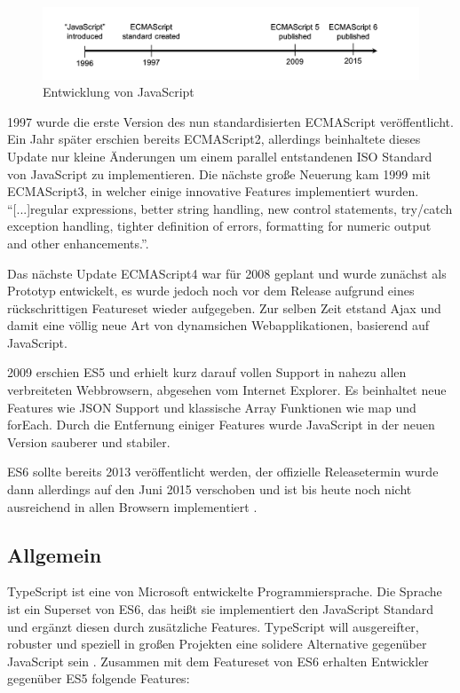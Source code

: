 \begin{figure}[hp]
 \centering
 \includegraphics[width=\linewidth]{kapitel2/javascript-timeline.png}
 \caption{Entwicklung von JavaScript \cite[28]{EssentialTS}}
\end{figure}

1997 wurde die erste Version des nun standardisierten ECMAScript veröffentlicht. Ein Jahr später erschien bereits ECMAScript2,
allerdings beinhaltete dieses Update nur kleine Änderungen um einem parallel entstandenen ISO Standard von JavaScript zu implementieren.
Die nächste große Neuerung kam 1999 mit ECMAScript3, in welcher einige innovative Features implementiert wurden.
``[...]regular expressions, better string handling, new control statements, try/catch exception handling, tighter definition of errors, formatting for numeric output and other enhancements.''\cite{js-vs-es}.

Das nächste Update ECMAScript4 war für 2008 geplant und wurde zunächst als Prototyp entwickelt,
es wurde jedoch noch vor dem Release aufgrund eines rückschrittigen Featureset wieder aufgegeben.
Zur selben Zeit etstand Ajax und damit eine völlig neue Art von dynamsichen Webapplikationen,
basierend auf JavaScript.

2009 erschien \ac{ES5} und erhielt kurz darauf vollen Support in nahezu allen verbreiteten Webbrowsern, abgesehen vom Internet Explorer.
Es beinhaltet neue Features wie \ac{JSON} Support und klassische Array Funktionen wie map und forEach.
Durch die Entfernung einiger Features wurde JavaScript in der neuen Version sauberer und stabiler.

\ac{ES6} sollte bereits 2013 veröffentlicht werden, der offizielle Releasetermin wurde
dann allerdings auf den Juni 2015 verschoben und ist bis heute noch nicht ausreichend in allen Browsern implementiert
\cite{js-vs-es}.

\subsection{Allgemein}

TypeScript ist eine von Microsoft entwickelte Programmiersprache.
Die Sprache ist ein Superset von \ac{ES6}, das heißt sie implementiert den JavaScript Standard und ergänzt diesen
durch zusätzliche Features.
TypeScript will ausgereifter, robuster und speziell in großen Projekten eine solidere Alternative gegenüber JavaScript sein \cite[28]{EssentialTS}.
Zusammen mit dem Featureset von \ac{ES6} erhalten Entwickler gegenüber \ac{ES5} folgende Features:

